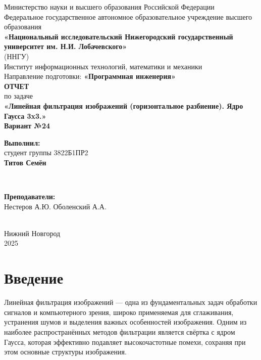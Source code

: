 \documentclass[12pt]{article}
\begin{document}
\begin{titlepage}
    \centering
    \large
    Министерство науки и высшего образования Российской Федерации\\[0.5cm]
    Федеральное государственное автономное образовательное учреждение высшего образования\\[0.5cm]
    \textbf{«Национальный исследовательский Нижегородский государственный университет им. Н.И. Лобачевского»}\\
    (ННГУ)\\[1cm]
    Институт информационных технологий, математики и механики\\[0.5cm]
    Направление подготовки: \textbf{«Программная инженерия»}\\[2cm]

    \vfill
    {\LARGE \textbf{ОТЧЕТ}}\\[0.5cm]
    {\Large по задаче}\\[0.5cm]
    {\LARGE \textbf{«Линейная фильтрация изображений (горизонтальное разбиение). Ядро Гаусса 3x3.»}}\\[0.5cm]
    {\Large \textbf{Вариант №24}}\\[2.5cm]

    \hfill\parbox{0.5\textwidth}{
        \textbf{Выполнил:} \\
        студент группы 3822Б1ПР2 \\
        \textbf{Титов Семён}
    }\\[0.5cm]

    \hfill\parbox{0.5\textwidth}{
        \textbf{Преподаватели:} \\
        Нестеров А.Ю.
        Оболенский А.А.

    }\\[2cm]

    Нижний Новгород\\
    2025
\end{titlepage}


\thispagestyle{empty}
\clearpage
{} 
\setcounter{page}{2} 
\tableofcontents
\clearpage
\setcounter{page}{3} 
\section{Введение}

\hspace*{1.25em}Линейная фильтрация изображений — одна из фундаментальных задач обработки сигналов и компьютерного зрения, широко применяемая для сглаживания, устранения шумов и выделения важных особенностей изображения. Одним из наиболее распространённых методов фильтрации является свёртка с ядром Гаусса, которая эффективно подавляет высокочастотные помехи, сохраняя при этом основные структуры изображения.
\end{document}

